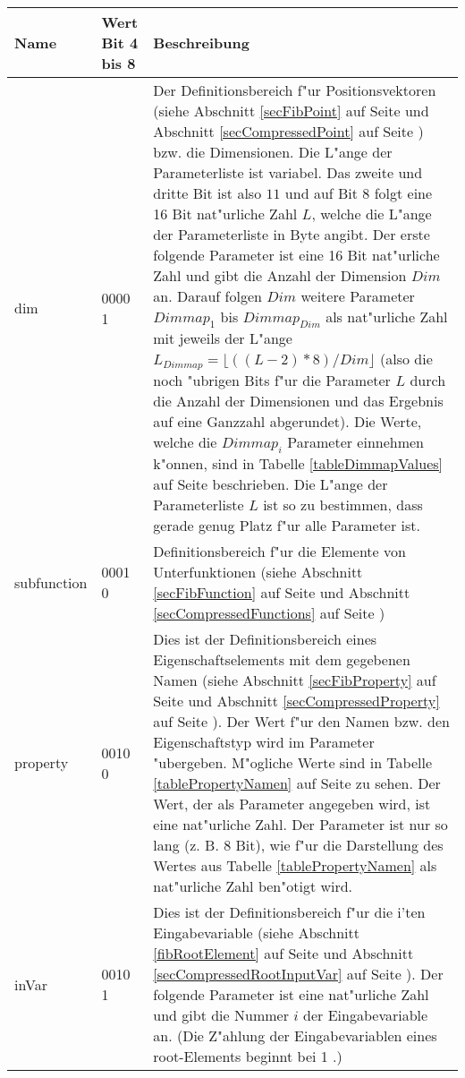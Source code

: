\begin{center}
\begin{longtable}{|p{25mm}|p{15mm}|p{85mm}|}\hline
	Name & Wert Bit 4 bis 8 & Beschreibung \\\hline\endhead
	dim & 0000 1 & Der Definitionsbereich f"ur Positionsvektoren (siehe Abschnitt \ref{secFibPoint} auf Seite \pageref{secFibPoint} und Abschnitt \ref{secCompressedPoint} auf Seite \pageref{secCompressedPoint}) bzw. die Dimensionen. Die L"ange der Parameterliste ist variabel. Das zweite und dritte Bit ist also $11$ und auf Bit 8 folgt eine 16 Bit nat"urliche Zahl $L$, welche die L"ange der Parameterliste in Byte angibt. Der erste folgende Parameter ist eine 16 Bit nat"urliche Zahl und gibt die Anzahl der Dimension $Dim$ an. Darauf folgen $Dim$ weitere Parameter $Dimmap_1$ bis $Dimmap_{Dim}$ als nat"urliche Zahl mit jeweils der L"ange $L_{Dimmap}=\lfloor((L-2) * 8)/Dim\rfloor$ (also die noch "ubrigen Bits f"ur die Parameter $L$ durch die Anzahl der Dimensionen und das Ergebnis auf eine Ganzzahl abgerundet). Die Werte, welche die $Dimmap_i$ Parameter einnehmen k"onnen, sind in Tabelle \ref{tableDimmapValues} auf Seite \pageref{tableDimmapValues} beschrieben. Die L"ange der Parameterliste $L$ ist so zu bestimmen, dass gerade genug Platz f"ur alle Parameter ist.\\\hline
	subfunction & 0001 0 & Definitionsbereich f"ur die Elemente von Unterfunktionen (siehe Abschnitt \ref{secFibFunction} auf Seite \pageref{secFibFunction} und Abschnitt \ref{secCompressedFunctions} auf Seite \pageref{secCompressedFunctions})\\\hline
	property & 0010 0 & Dies ist der Definitionsbereich eines Eigenschaftselements mit dem gegebenen Namen (siehe Abschnitt \ref{secFibProperty} auf Seite \pageref{secFibProperty} und Abschnitt \ref{secCompressedProperty} auf Seite \pageref{secCompressedProperty}). Der Wert f"ur den Namen bzw. den Eigenschaftstyp wird im Parameter "ubergeben. M"ogliche Werte sind in Tabelle \ref{tablePropertyNamen} auf Seite \pageref{tablePropertyNamen} zu sehen. Der Wert, der als Parameter angegeben wird, ist eine nat"urliche Zahl. Der Parameter ist nur so lang (z. B. 8 Bit), wie f"ur die Darstellung des Wertes aus Tabelle \ref{tablePropertyNamen} als nat"urliche Zahl ben"otigt wird. \\\hline
	inVar & 0010 1 & Dies ist der Definitionsbereich f"ur die i'ten Eingabevariable (siehe Abschnitt \ref{fibRootElement} auf Seite \pageref{fibRootElement} und Abschnitt \ref{secCompressedRootInputVar} auf Seite \pageref{secCompressedRootInputVar}). Der folgende Parameter ist eine nat"urliche Zahl und gibt die Nummer $i$ der Eingabevariable an. (Die Z"ahlung der Eingabevariablen eines root-Elements beginnt bei 1 .) \\\hline


\end{longtable}
\end{center}
